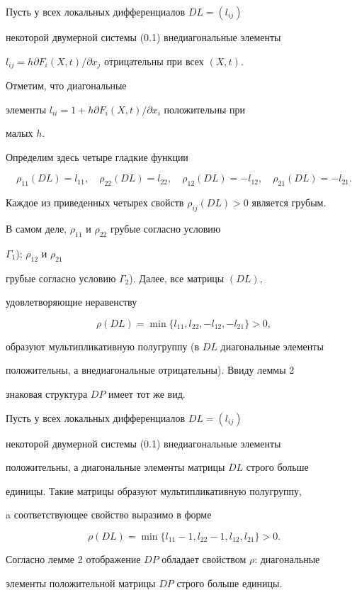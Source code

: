 \begin{exam} 


Пусть у всех локальных дифференциалов $D L=(l_{i j})$ 


некоторой двумерной системы (0.1) внедиагональные элементы 


$l_{i j}=h\partial F_i(X,t)/\partial x_j$ отрицательны при всех $(X,t)$. 


Отметим, что диагональные 


элементы $l_{i i}=1+h\partial F_i(X,t)/\partial x_i$ положительны при 


малых $h$. 


Определим здесь четыре гладкие функции 


$$ 


\rho_{11}(D L)=l_{11},\quad \rho_{22}(D L)=l_{22},\quad 


\rho_{12}(D L)=-l_{12},\quad \rho_{21}(D L)=-l_{21}. 


$$ 


Каждое из приведенных четырех свойств $\rho_{i j}(D L)>0$ является грубым. 


В самом деле, $\rho_{11}$ и $\rho_{22}$ грубые согласно условию 


$\Gamma_1$); $\rho_{12}$ и $\rho_{21}$ 


грубые согласно условию $\Gamma_2$). Далее, все матрицы $(D L)$, 


удовлетворяющие неравенству 


$$ 


\rho(D L)=\min\{l_{11},l_{22},-l_{12},-l_{21}\}>0, 


$$ 


образуют мультипликативную полугруппу (в $D L$ диагональные элементы 


положительны, а внедиагональные отрицательны). Ввиду леммы 2 


знаковая структура $D P$ имеет тот же вид. 


\end{exam} 


 


\begin{exam} 


Пусть у всех локальных дифференциалов $D L=(l_{i j})$ 


некоторой двумерной системы (0.1) внедиагональные элементы 


положительны, а диагональные элементы матрицы $D L$ строго больше 


единицы. Такие матрицы образуют мультипликативную полугруппу,


a соответствующее свойство выразимо в форме 


$$ 


\rho(D L)=\min\{l_{11}-1,l_{22}-1,l_{12},l_{21}\}>0. 


$$ 


Согласно лемме 2 отображение $D P$ обладает свойством $\rho$: диагональные 


элементы положительной матрицы $D P$ строго больше единицы. 


\end{exam} 


